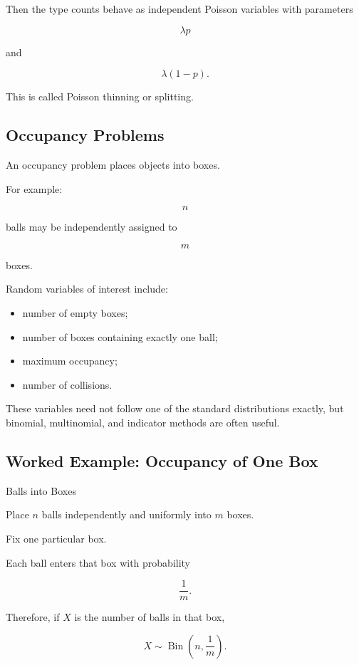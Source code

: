 Then the type counts behave as independent Poisson variables with
parameters

\[
\boxed{
\lambda p
}
\]

and

\[
\boxed{
\lambda(1-p).
}
\]

This is called Poisson thinning or splitting.

\subsection{Occupancy Problems}
\label{subsec:occupancy-distributions}

An occupancy problem places objects into boxes.

For example:

\[
n
\]

balls may be independently assigned to

\[
m
\]

boxes.

Random variables of interest include:

\begin{itemize}
    \item number of empty boxes;
    \item number of boxes containing exactly one ball;
    \item maximum occupancy;
    \item number of collisions.
\end{itemize}

These variables need not follow one of the standard distributions
exactly, but binomial, multinomial, and indicator methods are often
useful.

\subsection{Worked Example: Occupancy of One Box}
\label{subsec:worked-occupancy-one-box}

\begin{workedexamplebox}{Balls into Boxes}

Place \(n\) balls independently and uniformly into \(m\) boxes.

Fix one particular box.

Each ball enters that box with probability

\[
\frac1m.
\]

Therefore, if \(X\) is the number of balls in that box,

\begin{answerbox}
\[
\boxed{
X
\sim
\operatorname{Bin}
\left(
n,\frac1m
\right).
}
\]
\end{answerbox}

\end{workedexamplebox}

